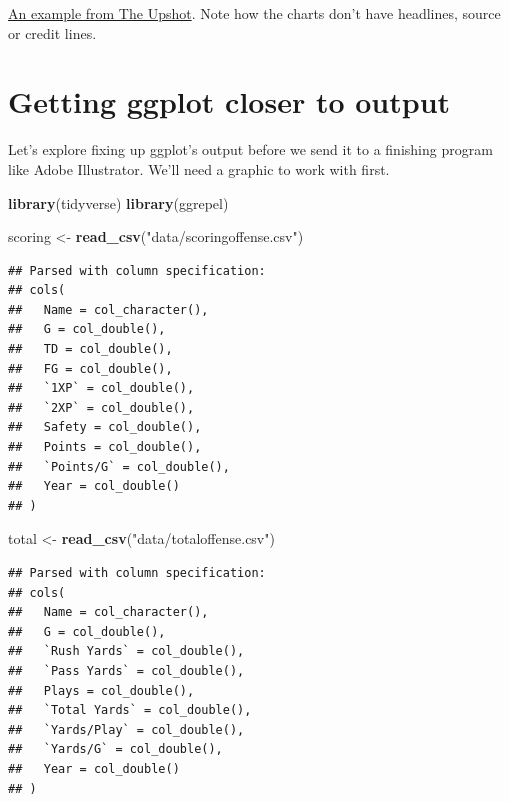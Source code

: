 \documentclass[
]{book}
\newenvironment{Shaded}{\begin{snugshade}}{\end{snugshade}}
\newcommand{\KeywordTok}[1]{\textcolor[rgb]{0.13,0.29,0.53}{\textbf{#1}}}
\newcommand{\NormalTok}[1]{#1}
\newcommand{\StringTok}[1]{\textcolor[rgb]{0.31,0.60,0.02}{#1}}
\begin{document}
\href{https://www.nytimes.com/interactive/2018/02/14/business/economy/inflation-prices.html}{An example from The Upshot}. Note how the charts don't have headlines, source or credit lines.

\hypertarget{getting-ggplot-closer-to-output}{%
\section{Getting ggplot closer to output}\label{getting-ggplot-closer-to-output}}

Let's explore fixing up ggplot's output before we send it to a finishing program like Adobe Illustrator. We'll need a graphic to work with first.

\begin{Shaded}
\begin{Highlighting}[]
\KeywordTok{library}\NormalTok{(tidyverse)}
\KeywordTok{library}\NormalTok{(ggrepel)}
\end{Highlighting}
\end{Shaded}

\begin{Shaded}
\begin{Highlighting}[]
\NormalTok{scoring <-}\StringTok{ }\KeywordTok{read_csv}\NormalTok{(}\StringTok{"data/scoringoffense.csv"}\NormalTok{)}
\end{Highlighting}
\end{Shaded}

\begin{verbatim}
## Parsed with column specification:
## cols(
##   Name = col_character(),
##   G = col_double(),
##   TD = col_double(),
##   FG = col_double(),
##   `1XP` = col_double(),
##   `2XP` = col_double(),
##   Safety = col_double(),
##   Points = col_double(),
##   `Points/G` = col_double(),
##   Year = col_double()
## )
\end{verbatim}

\begin{Shaded}
\begin{Highlighting}[]
\NormalTok{total <-}\StringTok{ }\KeywordTok{read_csv}\NormalTok{(}\StringTok{"data/totaloffense.csv"}\NormalTok{)}
\end{Highlighting}
\end{Shaded}

\begin{verbatim}
## Parsed with column specification:
## cols(
##   Name = col_character(),
##   G = col_double(),
##   `Rush Yards` = col_double(),
##   `Pass Yards` = col_double(),
##   Plays = col_double(),
##   `Total Yards` = col_double(),
##   `Yards/Play` = col_double(),
##   `Yards/G` = col_double(),
##   Year = col_double()
## )
\end{verbatim}
\end{document}

